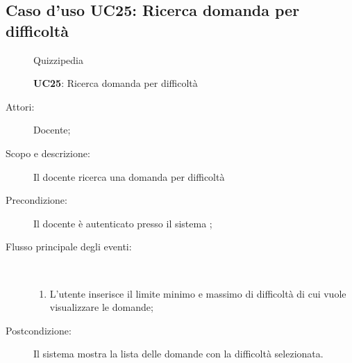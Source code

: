 \subsection{Caso d'uso UC25: Ricerca domanda per difficoltà}
	\begin{figure}[H]
		\centering
		\begin{resizedtikzpicture}{\textwidth}
		\begin{umlsystem}[x=0, fill=lightgray!20]{Quizzipedia}
		\end{umlsystem}
		\end{resizedtikzpicture}
		\caption{\textbf{UC25}: Ricerca domanda per difficoltà}
		\label{UC25}
	\end{figure}
\begin{description}
\item[Attori:] Docente;
\item[Scopo e descrizione:] Il docente ricerca una domanda per difficoltà

      \item[Precondizione:] Il docente è autenticato presso il sistema
;

        \item[Flusso principale degli eventi:] \ 
 \begin{enumerate}
          \item L'utente inserisce il limite minimo e massimo di difficoltà di cui vuole visualizzare le domande;

      \end{enumerate}
    \item[Postcondizione:] Il sistema mostra la lista delle domande con la difficoltà selezionata.
  \end{description}
\hypertarget{UC26}{}
